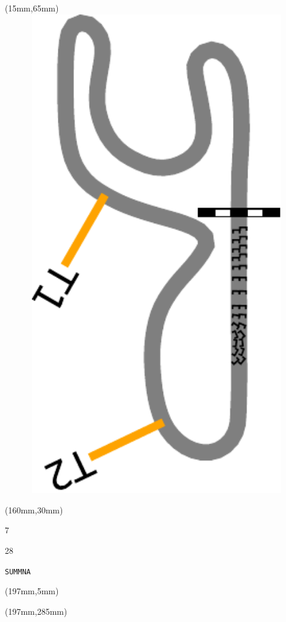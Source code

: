 \begin{textblock*}{185mm}(15mm,65mm)%
\centering
\mbox{\includegraphics[width=185mm,height=210mm,keepaspectratio]{PT/SUMMNA.pdf}}
\end{textblock*}
\begin{textblock*}{40mm}(160mm,30mm)%
\Large
\par{} 
\par7 
\par28 
\par\hfill\tiny\tt SUMMNA\\
\end{textblock*}
\begin{textblock*}{20mm}(197mm,5mm)%
\fbox{\thepage}
\label{SUMMNA}
\end{textblock*}
\begin{textblock*}{20mm}(197mm,285mm)%
\fbox{\thepage}
\end{textblock*}

